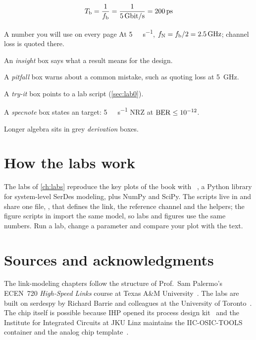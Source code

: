 {\renewcommand{\thewexample}{P.1}%
\begin{keyeq}
\[ \Tb = \frac{1}{\fb} = \frac{1}{\qty{5}{\giga\bit\per\second}} = \qty{200}{\pico\second} \]
\end{keyeq}
\begin{example}{A number you will use on every page}
At \qty{5}{\giga\bit\per\second}, $f_\mathrm{N} = f_\mathrm{b}/2 = \qty{2.5}{\giga\hertz}$; channel loss is quoted there.
\end{example}}
\setcounter{wexample}{0}
\begin{insight}
An \emph{insight} box says what a result means for the \OS{} design.
\end{insight}
\begin{pitfall}
A \emph{pitfall} box warns about a common mistake, such as quoting loss at \qty{5}{\giga\hertz}.
\end{pitfall}
\begin{tryit}
A \emph{try-it} box points to a lab script (\cref{sec:lab0}).
\end{tryit}
\begin{specnote}
A \emph{specnote} box states an \OS{} target: \qty{5}{\giga\bit\per\second} NRZ at $\mathrm{BER} \le 10^{-12}$.
\end{specnote}
Longer algebra sits in grey \emph{derivation} boxes.

\section*{How the labs work}
The labs of \cref{ch:labs} reproduce the key plots of the book with ~\cite{serdespy}, a Python library for system-level SerDes modeling, plus NumPy and SciPy. The scripts live in  and share one file, , that defines the link, the reference channel and the helpers; the figure scripts in  import the same model, so labs and figures use the same numbers. Run a lab, change a parameter and compare your plot with the text.

\section*{Sources and acknowledgments}
The link-modeling chapters follow the structure of Prof.\ Sam Palermo's ECEN~720 \emph{High-Speed Links} course at Texas A\&M University~\cite{palermo720}. The labs are built on serdespy by Richard Barrie and colleagues at the University of Toronto~\cite{serdespy}. The chip itself is possible because IHP opened its \sgx{} process design kit~\cite{ihppdk} and the Institute for Integrated Circuits at JKU Linz maintains the IIC-OSIC-TOOLS container and the analog chip template~\cite{iicosic,jkutemplate}.

